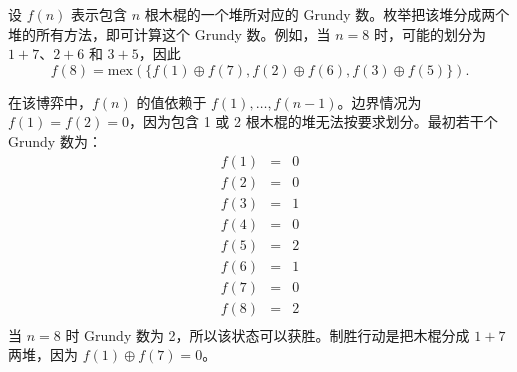 设 $f(n)$ 表示包含 $n$ 根木棍的一个堆所对应的 Grundy 数。枚举把该堆分成两个堆的所有方法，即可计算这个 Grundy 数。例如，当 $n=8$ 时，可能的划分为 $1+7$、$2+6$ 和 $3+5$，因此
\[f(8)=\textrm{mex}(\{f(1) \oplus f(7), f(2) \oplus f(6), f(3) \oplus f(5)\}).\]

在该博弈中，$f(n)$ 的值依赖于 $f(1),\ldots,f(n-1)$。边界情况为 $f(1)=f(2)=0$，因为包含 1 或 2 根木棍的堆无法按要求划分。最初若干个 Grundy 数为：
\[
\begin{array}{lcl}
f(1) & = & 0 \\
f(2) & = & 0 \\
f(3) & = & 1 \\
f(4) & = & 0 \\
f(5) & = & 2 \\
f(6) & = & 1 \\
f(7) & = & 0 \\
f(8) & = & 2 \\
\end{array}
\]
当 $n=8$ 时 Grundy 数为 2，所以该状态可以获胜。制胜行动是把木棍分成 $1+7$ 两堆，因为 $f(1) \oplus f(7) = 0$。
